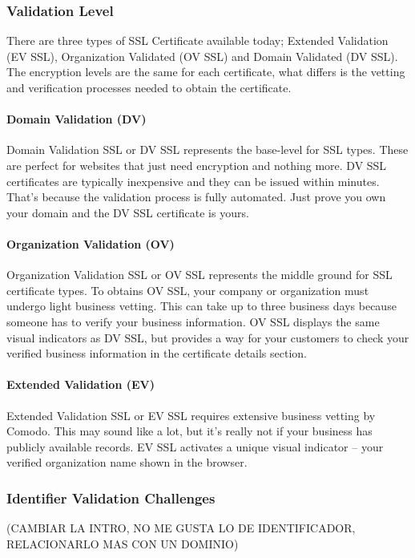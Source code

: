 \subsubsection*{Validation Level}
There are three types of SSL Certificate available today; Extended Validation 
(EV SSL), Organization Validated (OV SSL) and Domain Validated (DV SSL). The 
encryption levels are the same for each certificate, what differs is the vetting
 and verification processes needed to obtain the certificate.
\paragraph*{Domain Validation (DV)}
Domain Validation SSL or DV SSL represents the base-level for SSL types. These 
are perfect for websites that just need encryption and nothing more. DV SSL 
certificates are typically inexpensive and they can be issued within minutes. That's 
because the validation process is fully automated. Just prove you own your domain 
and the DV SSL certificate is yours.
\paragraph*{Organization Validation (OV)}
Organization Validation SSL or OV SSL represents the middle ground for SSL certificate 
types. To obtains OV SSL, your company or organization must undergo light business
 vetting. This can take up to three business days because someone has to verify 
 your business information. OV SSL displays the same visual indicators as DV SSL,
  but provides a way for your customers to check your verified business information 
  in the certificate details section.
\paragraph*{Extended Validation (EV)}
Extended Validation SSL or EV SSL requires extensive business vetting by Comodo. This
 may sound like a lot, but it's really not if your business has publicly available 
 records. EV SSL activates a unique visual indicator – your verified organization name
  shown in the browser.

  
\subsubsection*{Identifier Validation Challenges}

(CAMBIAR LA INTRO, NO ME GUSTA LO DE IDENTIFICADOR, RELACIONARLO MAS CON UN DOMINIO)

